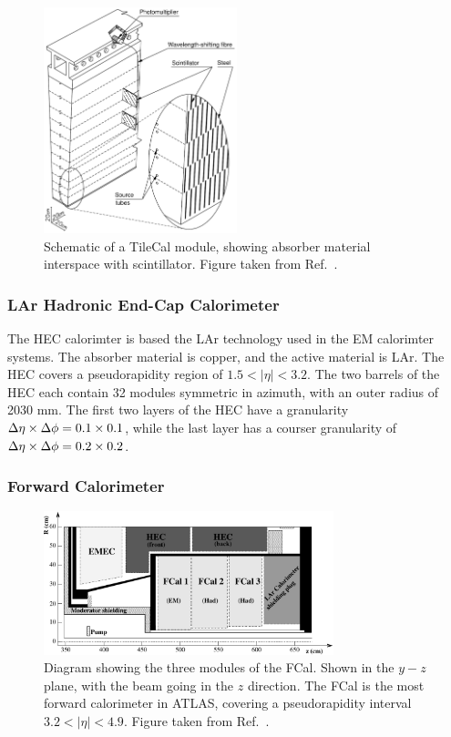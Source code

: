 {\begin{figure}
	\centering
	\includegraphics[width=0.5\textwidth]{figures/tile_1.pdf} %
	\caption{ Schematic of a TileCal module, showing absorber material interspace with scintillator. Figure taken from Ref.~\cite{Aad:2008zzm}.}	
	\label{fig:tilecalmodule}
\end{figure}

\subsubsection{LAr Hadronic End-Cap Calorimeter}
The HEC calorimter is based the LAr technology used in the EM calorimter systems. The absorber material is copper, and the active material is LAr. The HEC covers a pseudorapidity region of $1.5<|\eta|<3.2$. The two barrels of the HEC each contain 32 modules symmetric in azimuth, with an outer radius of 2030 mm. The first two layers of the HEC have a granularity $\mbox{$\Delta \eta$}\times\mbox{$\Delta \phi$}=0.1\times0.1$, while the last layer has a courser granularity of $\mbox{$\Delta \eta$}\times\mbox{$\Delta \phi$}=0.2\times0.2$.

\subsubsection{Forward Calorimeter}

\begin{figure}
	\centering
	\includegraphics[width=0.75\textwidth]{figures/fcal_1.pdf} %
	\caption{ Diagram showing the three modules of the FCal. Shown in the $y-z$ plane, with the beam going in the $z$ direction. The FCal is the most forward calorimeter in ATLAS, covering a pseudorapidity interval $3.2<|\eta|<4.9$. Figure taken from Ref.~\cite{Aad:2008zzm}.}	
	\label{fig:fcalmodules}
\end{figure}

}
